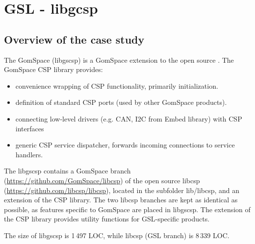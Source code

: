 
\clearpage

\section{GSL - libgcsp}
\label{sec:caseStudies:GSL:libgcsp}

\subsection{Overview of the case study}

The GomSpace  (libgscsp) is a GomSpace extension to the open source .
The GomSpace CSP library provides:
\begin{itemize}
\item convenience wrapping of CSP functionality, primarily initialization.
\item definition of standard CSP ports (used by other GomSpace products).
\item connecting low-level drivers (e.g. CAN, I2C from Embed library) with CSP interfaces 
\item generic CSP service dispatcher, forwards incoming connections to service handlers.
\end{itemize}

The libgscsp contains a GomSpace branch (\url{https://github.com/GomSpace/libcsp}) of the open source libcsp (\url{https://github.com/libcsp/libcsp}), located in the subfolder lib/libcsp, and an extension of the CSP library. The two libcsp branches are kept as identical as possible, as features specific to GomSpace are placed in libgscsp. The extension of the CSP library provides utility functions for GSL-specific products.



The size of libgscsp is 1\,497 LOC, %
while libcsp (GSL branch) is 8\,339 LOC. %


